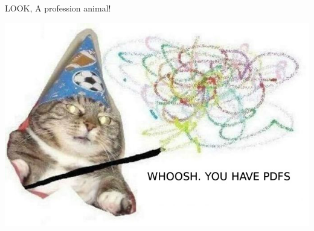\documentclass{article}
\begin{document}
LOOK, A {{profession}} {{animal}}!

\includegraphics{woosh.jpeg}
\end{document}

